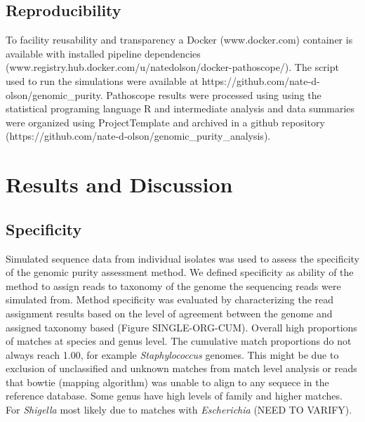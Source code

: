 \documentclass[fleqn,10pt,lineno]{wlpeerj}\usepackage[]{graphicx}\usepackage[]{color}
\begin{document}
\subsection*{Reproducibility}
To facility reusability and transparency a Docker (www.docker.com) container is available with installed pipeline dependencies (www.registry.hub.docker.com/u/natedolson/docker-pathoscope/). 
The script used to run the simulations were available at https://github.com/nate-d-olson/genomic\_purity. 
Pathoscope results were processed using using the statistical programing language R \citep{R} and intermediate analysis and data summaries were organized using ProjectTemplate and archived in a github repository (https://github.com/nate-d-olson/genomic\_purity\_analysis).

\section*{Results and Discussion}

\subsection*{Specificity}

Simulated sequence data from individual isolates was used to assess the specificity of the genomic purity assessment method.  
We defined specificity as ability of the method to assign reads to taxonomy of the genome the sequencing reads were simulated from. 
Method specificity was evaluated by characterizing the read assignment results based on the level of agreement between the genome and assigned taxonomy based (Figure SINGLE-ORG-CUM). 
Overall high proportions of matches at species and genus level. 
The cumulative match proportions do not always reach 1.00, for example \textit{Staphylococcus} genomes. 
This might be due to exclusion of unclassified and unknown matches from match level analysis or reads that bowtie (mapping algorithm) was unable to align to any sequece in the reference database. 
Some genus have high levels of family and higher matches. 
For \textit{Shigella} most likely due to matches with \textit{Escherichia} (NEED TO VARIFY). 

 
\end{document}

